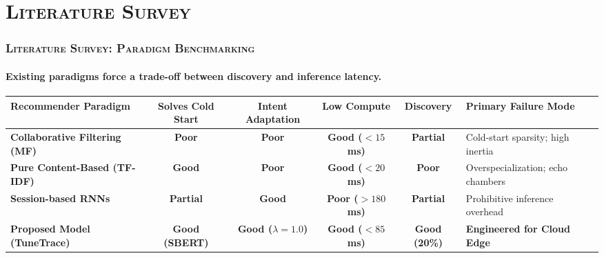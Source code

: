 \documentclass[aspectratio=169,10pt]{beamer}
\begin{document}
\section{\textsc{Literature Survey}}
\begin{frame}
  \frametitle{\textsc{Literature Survey: Paradigm Benchmarking}}
  \framesubtitle{Existing paradigms force a trade-off between discovery and inference latency.}

  \vspace{3.5mm}
  \centering
  \fontsize{6.5pt}{8.5pt}\selectfont
  \renewcommand{\arraystretch}{1.5}
  \begin{tabular}{p{4.2cm}ccccp{4.5cm}}
      \toprule
      \rowcolor{inkLight}
      \textbf{Recommender Paradigm} & \textbf{Solves Cold Start} & \textbf{Intent Adaptation} & \textbf{Low Compute} & \textbf{Discovery} & \textbf{Primary Failure Mode} \\
      \midrule
      \textbf{Collaborative Filtering (MF)} & \color{focusRed}\textbf{Poor} & \color{focusRed}\textbf{Poor} & \textbf{Good ($<15$ms)} & \textbf{Partial} & Cold-start sparsity; high inertia \\
      \rowcolor{gray!10}
      \textbf{Pure Content-Based (TF-IDF)} & \textbf{Good} & \color{focusRed}\textbf{Poor} & \textbf{Good ($<20$ms)} & \color{focusRed}\textbf{Poor} & Overspecialization; echo chambers \\
      \textbf{Session-based RNNs} & \textbf{Partial} & \textbf{Good} & \color{focusRed}\textbf{Poor ($>180$ms)} & \textbf{Partial} & Prohibitive inference overhead \\
      \midrule
      \rowcolor{blue!5}
      \textbf{Proposed Model (TuneTrace)} & \textbf{\color{focusBlue}Good (SBERT)} & \textbf{\color{focusBlue}Good ($\lambda=1.0$)} & \textbf{\color{focusBlue}Good ($<85$ms)} & \textbf{\color{focusBlue}Good (20\%)} & \textbf{\color{focusBlue}Engineered for Cloud Edge} \\
      \bottomrule
  \end{tabular}
\end{frame}
\end{document}
